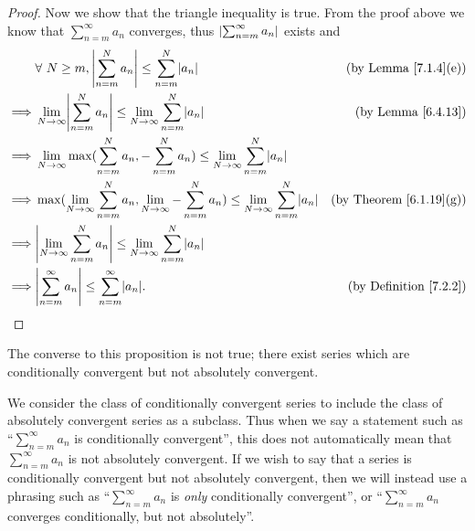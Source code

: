 \begin{proof}
    Now we show that the triangle inequality is true.
    From the proof above we know that \(\sum_{n = m}^\infty a_n\) converges, thus \(\abs*{\sum_{n = m}^\infty a_n}\) exists and
    \begin{align*}
                 & \forall\ N \geq m, \abs*{\sum_{n = m}^N a_n} \leq \sum_{n = m}^N \abs*{a_n}                                                              & \text{(by Lemma \ref{7.1.4}(e))}    \\
        \implies & \lim_{N \to \infty} \abs*{\sum_{n = m}^N a_n} \leq \lim_{N \to \infty} \sum_{n = m}^N \abs*{a_n}                                         & \text{(by Lemma \ref{6.4.13})}      \\
        \implies & \lim_{N \to \infty} \max(\sum_{n = m}^N a_n, -\sum_{n = m}^N a_n) \leq \lim_{N \to \infty} \sum_{n = m}^N \abs*{a_n}                                                           \\
        \implies & \max(\lim_{N \to \infty} \sum_{n = m}^N a_n, \lim_{N \to \infty} -\sum_{n = m}^N a_n) \leq \lim_{N \to \infty} \sum_{n = m}^N \abs*{a_n} & \text{(by Theorem \ref{6.1.19}(g))} \\
        \implies & \abs*{\lim_{N \to \infty} \sum_{n = m}^N a_n} \leq \lim_{N \to \infty} \sum_{n = m}^N \abs*{a_n}                                                                               \\
        \implies & \abs*{\sum_{n = m}^\infty a_n} \leq \sum_{n = m}^\infty \abs*{a_n}.                                                                      & \text{(by Definition \ref{7.2.2})}
    \end{align*}
\end{proof}

\begin{remark}\label{7.2.10}
    The converse to this proposition is not true;
    there exist series which are conditionally convergent but not absolutely convergent.
\end{remark}

\begin{remark}\label{7.2.11}
    We consider the class of conditionally convergent series to include the class of absolutely convergent series as a subclass.
    Thus when we say a statement such as ``\(\sum_{n = m}^\infty a_n\) is conditionally convergent'', this does not automatically mean that \(\sum_{n = m}^\infty a_n\) is not absolutely convergent.
    If we wish to say that a series is conditionally convergent but not absolutely convergent, then we will instead use a phrasing such as ``\(\sum_{n = m}^\infty a_n\) is \emph{only} conditionally convergent'', or ``\(\sum_{n = m}^\infty a_n\) converges conditionally, but not absolutely''.
\end{remark}


